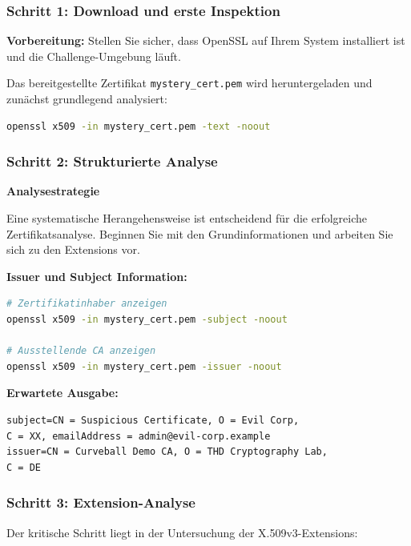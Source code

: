 \documentclass{article}
\begin{document}
\subsubsection{Schritt 1: Download und erste Inspektion}

\begin{warningbox}
\textbf{Vorbereitung:} Stellen Sie sicher, dass OpenSSL auf Ihrem System installiert ist und die Challenge-Umgebung läuft.
\end{warningbox}

Das bereitgestellte Zertifikat \texttt{mystery\_cert.pem} wird heruntergeladen und zunächst grundlegend analysiert:

\begin{lstlisting}[language=bash,caption={Grundlegende Zertifikatsinformationen}]
openssl x509 -in mystery_cert.pem -text -noout
\end{lstlisting}

\subsubsection{Schritt 2: Strukturierte Analyse}

\begin{infobox}
\textbf{Analysestrategie}

Eine systematische Herangehensweise ist entscheidend für die erfolgreiche Zertifikatsanalyse. Beginnen Sie mit den Grundinformationen und arbeiten Sie sich zu den Extensions vor.
\end{infobox}

\textbf{Issuer und Subject Information:}
\begin{lstlisting}[language=bash]
# Zertifikatinhaber anzeigen
openssl x509 -in mystery_cert.pem -subject -noout

# Ausstellende CA anzeigen  
openssl x509 -in mystery_cert.pem -issuer -noout
\end{lstlisting}

\textbf{Erwartete Ausgabe:}
\begin{lstlisting}[caption=Zertifikatsinformationen]
subject=CN = Suspicious Certificate, O = Evil Corp, 
C = XX, emailAddress = admin@evil-corp.example
issuer=CN = Curveball Demo CA, O = THD Cryptography Lab, 
C = DE
\end{lstlisting}

\subsubsection{Schritt 3: Extension-Analyse}
Der kritische Schritt liegt in der Untersuchung der X.509v3-Extensions:
\end{document}
